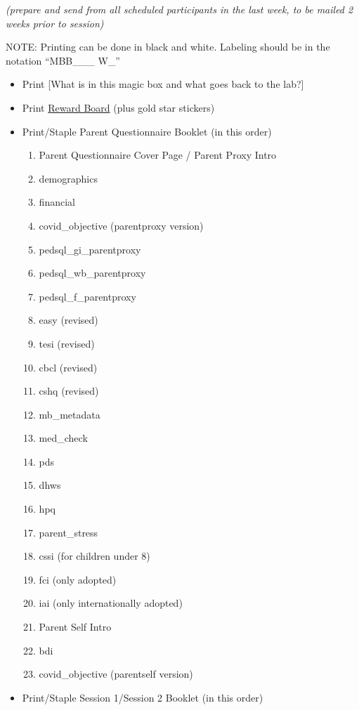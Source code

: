 \documentclass[]{book}
\providecommand{\tightlist}{%
  \setlength{\itemsep}{0pt}\setlength{\parskip}{0pt}}
\begin{document}
\emph{(prepare and send from all scheduled participants in the last week, to be mailed 2 weeks prior to session)}

NOTE: Printing can be done in black and white. Labeling should be in the notation ``MBB\_\_\_ W\_''

\begin{itemize}
\tightlist
\item
  Print {[}What is in this magic box and what goes back to the lab?{]}
\item
  Print \href{https://ucla.app.box.com/file/668504120930}{Reward Board} (plus gold star stickers)
\item
  Print/Staple Parent Questionnaire Booklet (in this order)

  \begin{enumerate}
  \def\labelenumi{\arabic{enumi}.}
  \tightlist
  \item
    Parent Questionnaire Cover Page / Parent Proxy Intro
  \item
    demographics
  \item
    financial
  \item
    covid\_objective (parentproxy version)
  \item
    pedsql\_gi\_parentproxy
  \item
    pedsql\_wb\_parentproxy
  \item
    pedsql\_f\_parentproxy
  \item
    easy (revised)
  \item
    tesi (revised)
  \item
    cbcl (revised)
  \item
    cshq (revised)
  \item
    mb\_metadata
  \item
    med\_check
  \item
    pds
  \item
    dhws
  \item
    hpq
  \item
    parent\_stress
  \item
    cssi (for children under 8)
  \item
    fci (only adopted)
  \item
    iai (only internationally adopted)
  \item
    Parent Self Intro
  \item
    bdi
  \item
    covid\_objective (parentself version)
  \end{enumerate}
\item
  Print/Staple Session 1/Session 2 Booklet (in this order)


\end{itemize}
\end{document}
